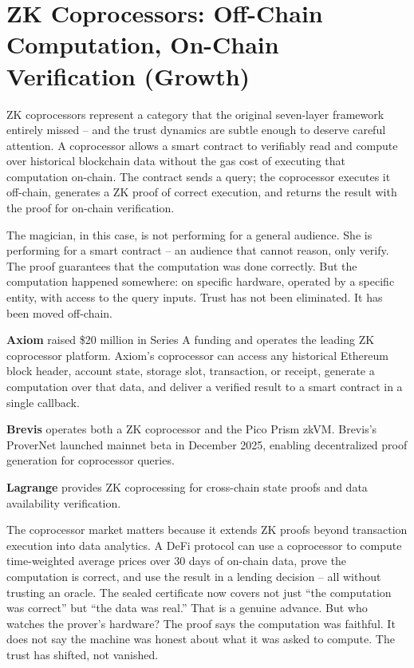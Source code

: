 \documentclass[
  11pt,
  openany]{report}
\renewcommand{\textbf}[1]{{\bfseries\color{MidnightBold}#1}}
\begin{document}
\section{ZK Coprocessors: Off-Chain Computation, On-Chain Verification
(Growth)}\label{zk-coprocessors-off-chain-computation-on-chain-verification-growth}

ZK coprocessors represent a category that the original seven-layer framework
entirely missed -- and the trust dynamics are subtle enough to deserve careful
attention. A coprocessor allows a smart contract to verifiably read and compute
over historical blockchain data without the gas cost of executing that
computation on-chain. The contract sends a query; the coprocessor executes it
off-chain, generates a ZK proof of correct execution, and returns the result
with the proof for on-chain verification.

The magician, in this case, is not performing for a general audience. She is
performing for a smart contract -- an audience that cannot reason, only verify.
The proof guarantees that the computation was done correctly. But the
computation happened somewhere: on specific hardware, operated by a specific
entity, with access to the query inputs. Trust has not been eliminated. It has
been moved off-chain.

\textbf{Axiom} raised \$20 million in Series A funding and operates the leading
ZK coprocessor platform. Axiom's coprocessor can access any historical Ethereum
block header, account state, storage slot, transaction, or receipt, generate a
computation over that data, and deliver a verified result to a smart contract in
a single callback.

\textbf{Brevis} operates both a ZK coprocessor and the Pico Prism zkVM. Brevis's
ProverNet launched mainnet beta in December 2025, enabling decentralized proof
generation for coprocessor queries.

\textbf{Lagrange} provides ZK coprocessing for cross-chain state proofs and data
availability verification.

The coprocessor market matters because it extends ZK proofs beyond transaction
execution into data analytics. A DeFi protocol can use a coprocessor to compute
time-weighted average prices over 30 days of on-chain data, prove the
computation is correct, and use the result in a lending decision -- all without
trusting an oracle. The sealed certificate now covers not just ``the computation
was correct'' but ``the data was real.'' That is a genuine advance. But who
watches the prover's hardware? The proof says the computation was faithful. It
does not say the machine was honest about what it was asked to compute. The
trust has shifted, not vanished.
\end{document}
